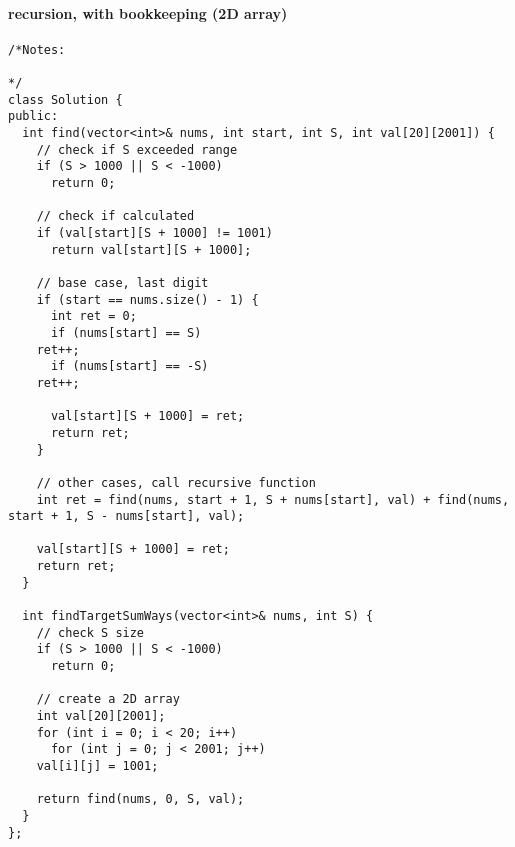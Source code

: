 \documentclass[11pt]{article}
\begin{document}
\paragraph{recursion, with bookkeeping (2D array)}
\label{sec:org48b545d}
\begin{verbatim}
/*Notes: 

*/
class Solution {
public:
  int find(vector<int>& nums, int start, int S, int val[20][2001]) {
    // check if S exceeded range
    if (S > 1000 || S < -1000)
      return 0;

    // check if calculated
    if (val[start][S + 1000] != 1001)
      return val[start][S + 1000];

    // base case, last digit 
    if (start == nums.size() - 1) {
      int ret = 0;
      if (nums[start] == S)
	ret++;
      if (nums[start] == -S)
	ret++;

      val[start][S + 1000] = ret;
      return ret;
    }

    // other cases, call recursive function
    int ret = find(nums, start + 1, S + nums[start], val) + find(nums, start + 1, S - nums[start], val);

    val[start][S + 1000] = ret;
    return ret;
  }

  int findTargetSumWays(vector<int>& nums, int S) {
    // check S size
    if (S > 1000 || S < -1000)
      return 0;

    // create a 2D array
    int val[20][2001];
    for (int i = 0; i < 20; i++)
      for (int j = 0; j < 2001; j++)
	val[i][j] = 1001;

    return find(nums, 0, S, val);
  }
};
\end{verbatim}
\end{document}
